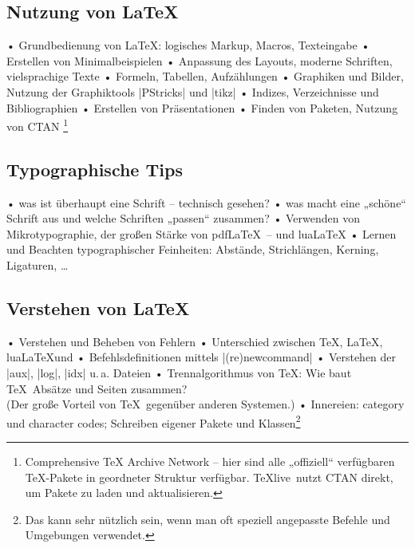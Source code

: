 \documentclass[12pt,ngerman]{scrartcl}
\newcommand{\TeXlive}{\TeX\textsf{live}\xspace}
\begin{document}
\subsection{Nutzung von \LaTeX}
\begin{itemize}
  • Grundbedienung von \LaTeX: logisches Markup, Macros, Texteingabe
  • Erstellen von Minimalbeispielen
  • Anpassung des Layouts, moderne Schriften, vielsprachige Texte
  • Formeln, Tabellen, Aufzählungen
  • Graphiken und Bilder, Nutzung der Graphiktools |PStricks| und |tikz|
  • Indizes, Verzeichnisse und Bibliographien
  • Erstellen von Präsentationen
  • Finden von Paketen, Nutzung von CTAN
\footnote{
  Comprehensive TeX Archive Network – hier sind alle „offiziell“ verfügbaren \TeX-Pakete in geordneter Struktur verfügbar. \TeXlive\ nutzt CTAN direkt, um Pakete zu laden und aktualisieren.}
\end{itemize}

\subsection{Typographische Tips}
\begin{itemize}
  • was ist überhaupt eine Schrift – technisch gesehen?
  • was macht eine „schöne“ Schrift aus und welche Schriften „passen“ zusammen?
  • Verwenden von Mikrotypographie, der großen Stärke von pdf\LaTeX\ – und \textsf{lua}\LaTeX
  • Lernen und Beachten typographischer Feinheiten: Abstände, Strichlängen, Kerning, Ligaturen, …
\end{itemize}

\subsection{Verstehen von \LaTeX}
\begin{itemize}
  • Verstehen und Beheben von Fehlern
  • Unterschied zwischen \TeX, \LaTeX, \textsf{lua}\LaTeX und \ConTeXt
  • Befehlsdefinitionen mittels |(re)newcommand|
  • Verstehen der |aux|, |log|, |idx| u.\,a. Dateien
  • Trennalgorithmus von \TeX: Wie baut \TeX\ Absätze und Seiten zusammen?\\ (Der große Vorteil von \TeX\ gegenüber anderen Systemen.)
  • Innereien: category und character codes; Schreiben eigener Pakete und Klassen\footnote{Das kann sehr nützlich sein, wenn man oft speziell angepasste Befehle und Umgebungen verwendet.}
\end{itemize}
\end{document}
